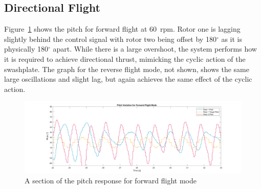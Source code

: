        \subsection{Directional Flight}
            Figure~\ref{fig: forward_pitch} shows the pitch for forward flight at 60~rpm. Rotor one is lagging slightly behind the control signal with rotor two being offset by 180\(^\circ\) as it is physically 180\(^\circ\) apart. While there is a large overshoot, the system performs how it is required to achieve directional thrust, mimicking the cyclic action of the swashplate. The graph for the reverse flight mode, not shown, shows the same large oscillations and slight lag, but again achieves the same effect of the cyclic action.\\
            \begin{figure}[h]
                \centering
                \includegraphics*[width =\textwidth]{figs/Data_Analysis/Pitch Graph-Forward Flight.png}
                \caption{A section of the pitch response for forward flight mode}
                \label{fig: forward_pitch}
            \end{figure}  

